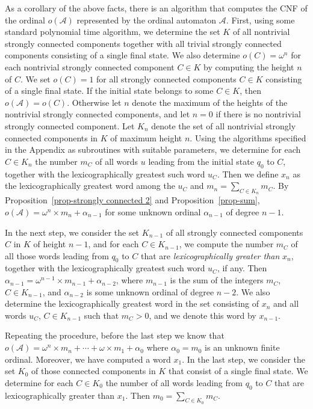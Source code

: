 \documentclass[copyright]{eptcs}
\newcommand{\cA}{\mathcal{A}}
\newcommand{\ord}{{o}}
\begin{document}
As a corollary of the above facts, there is an algorithm 
that computes the CNF of the ordinal $\ord(\cA)$ represented
by the ordinal automaton $\cA$. First, using some  standard polynomial time
algorithm,  we determine the set $K$  
of all nontrivial strongly connected components together with all 
trivial strongly connected components consisting of 
a single final state. We also determine $\ord(C) = \omega^n$ for each nontrivial 
strongly  connected component $C \in K$
by computing the height $n$ of $C$. We set $\ord(C) = 1$
for all strongly connected components $C \in K$ consisting
of a single final state.  If the initial state belongs to
some $C\in K$, then $\ord(\cA) = \ord(C)$. 
Otherwise let $n$ denote the maximum of the heights of the 
nontrivial strongly connected components, and let $n = 0$ if there 
is no nontrivial strongly connected component. Let $K_n$ denote the set 
of all nontrivial strongly connected components in $K$
of maximum height $n$. 
Using the algorithms specified in the Appendix as subroutines
with suitable parameters,
we determine for each $C\in K_n$ the number $m_C$ of all words $u$ 
leading from the initial state $q_0$ to $C$, together with the 
lexicographically greatest such word $u_C$. Then we define $x_n$ as the lexicographically 
greatest word among the $u_C$ and $m_n = \sum_{C \in K_n} m_C$.
By Proposition~\ref{prop-strongly connected 2}
and Proposition~\ref{prop-sum}, $\ord(\cA) = \omega^n \times m_n + \alpha_{n-1}$ for some 
unknown ordinal $\alpha_{n-1}$ of degree $n-1$. 

In the next step, we consider the set $K_{n-1}$ of all 
strongly connected components $C$ in $K$ of height $n-1$, 
and for each $C\in K_{n-1}$, we compute the number $m_C$ of all those words 
leading from $q_0$ to $C$ that are \emph{lexicographically greater
than} $x_n$, together with the lexicographically greatest such word
$u_C$, if any. Then $\alpha_{n-1} = \omega^{n-1} \times m_{n-1} + \alpha_{n-2}$, 
where $m_{n-1}$ is the sum of the integers $m_C$, $C \in K_{n-1}$,
 and $\alpha_{n-2}$ is some unknown ordinal of degree $n-2$. 
We also determine the lexicographically greatest 
word in the set consisting of $x_n$ and all words $u_C$, $C \in K_{n-1}$ 
such that $m_C > 0$, and we denote this word by $x_{n-1}$. 

Repeating the procedure, before the last step we know that 
$\ord(\cA) = \omega^n\times m_n  + \cdots + \omega \times m_1  +  \alpha_0$
where $\alpha_0 = m_0$ is an unknown finite ordinal. Moreover, we have computed a word 
$x_1$. In the last step, we consider the set $K_0$ of those connected
components in $K$ that consist of a single final state. We determine
for each $C \in K_0$ the number of all words leading from $q_0$ 
to $C$ that are lexicographically greater than $x_1$. Then 
$m_0 = \sum_{C \in K_0}m_C$.
\end{document}
